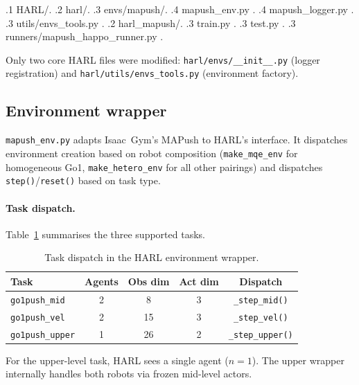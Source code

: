 \begin{dirtree}{%
.1 HARL/.
.2 harl/.
.3 envs/mapush/.
.4 mapush\_env.py .
.4 mapush\_logger.py .
.3 utils/envs\_tools.py .
.2 harl\_mapush/.
.3 train.py .
.3 test.py .
.3 runners/mapush\_happo\_runner.py .
}

Only two core HARL files were modified: \texttt{harl/envs/\_\_init\_\_.py}
(logger registration) and \texttt{harl/utils/envs\_tools.py} (environment
factory).

\subsection{Environment wrapper}

\texttt{mapush\_env.py} adapts Isaac~Gym's MAPush to HARL's interface.
It dispatches environment creation based on robot composition
(\texttt{make\_mqe\_env} for homogeneous Go1, \texttt{make\_hetero\_env}
for all other pairings) and dispatches \texttt{step()}/\texttt{reset()}
based on task type.

\paragraph{Task dispatch.}
Table~\ref{tab:task-dispatch} summarises the three supported tasks.

\begin{table}[h]
  \centering
  \caption{Task dispatch in the HARL environment wrapper.}
  \label{tab:task-dispatch}
  \begin{tabular}{lcccc}
    \toprule
    \textbf{Task} & \textbf{Agents} & \textbf{Obs dim} & \textbf{Act dim} & \textbf{Dispatch} \\
    \midrule
    \texttt{go1push\_mid}   & 2 & 8  & 3 & \texttt{\_step\_mid()} \\
    \texttt{go1push\_vel}   & 2 & 15 & 3 & \texttt{\_step\_vel()} \\
    \texttt{go1push\_upper} & 1 & 26 & 2 & \texttt{\_step\_upper()} \\
    \bottomrule
  \end{tabular}
\end{table}

For the upper-level task, HARL sees a single agent ($n=1$). The upper
wrapper internally handles both robots via frozen mid-level actors.


\end{dirtree}
